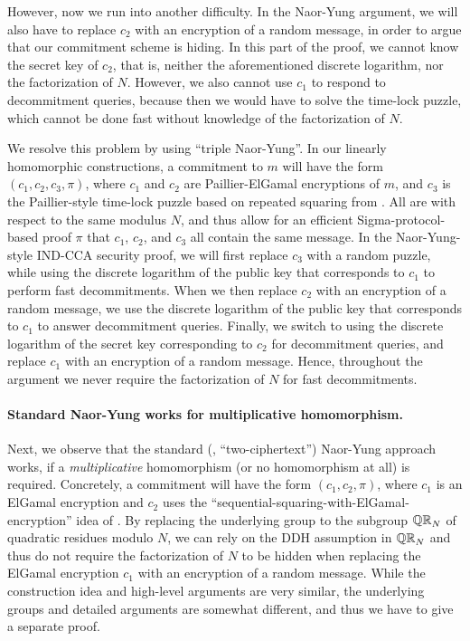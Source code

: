 However, now we run into another difficulty. In the Naor-Yung argument, we will also have to replace $c_2$ with an encryption of a random message, in order to argue that our commitment scheme is hiding. In this part of the proof, we cannot know the secret key of $c_2$, that is, neither the aforementioned discrete logarithm, nor the factorization of $N$. However, we also cannot use $c_1$ to respond to decommitment queries, because then we would have to solve the time-lock puzzle, which cannot be done fast without knowledge of the factorization of $N$.

We resolve this problem by using ``triple Naor-Yung''. In our linearly homomorphic constructions, a commitment to $m$ will have the form $(c_1, c_2, c_3, \pi)$, where $c_1$ and $c_2$ are Paillier-ElGamal encryptions of $m$, and $c_3$ is the Paillier-style time-lock puzzle based on repeated squaring from \cite{C:MalThy19}. All are with respect to the same modulus $N$, and thus allow for an efficient Sigma-protocol-based proof $\pi$ that $c_1$, $c_2$, and $c_3$ all contain the same message. In the Naor-Yung-style IND-CCA security proof, we will first replace $c_3$ with a random puzzle, while using the discrete logarithm of the public key that corresponds to $c_1$ to perform fast decommitments. When we then replace $c_2$ with an encryption of a random message, we use the discrete logarithm of the public key that corresponds to $c_1$ to answer decommitment queries. Finally, we switch to using the discrete logarithm of the secret key corresponding to $c_{2}$ for decommitment queries, and replace $c_{1}$ with an encryption of a random message. Hence, throughout the argument we never require the factorization of $N$ for fast decommitments.


\paragraph{Standard Naor-Yung works for multiplicative homomorphism.}
Next, we observe that the standard (\ie, ``two-ciphertext'') Naor-Yung approach works, if a \emph{multiplicative} homomorphism (or no homomorphism at all) is required. Concretely, a commitment will have the form $(c_1, c_2, \pi)$, where $c_1$ is an ElGamal encryption and $c_2$ uses the ``sequential-squaring-with-ElGamal-encryption'' idea of \cite{C:MalThy19}. By replacing the underlying group to the subgroup $\mathbb{QR}_N$ of quadratic residues modulo $N$, we can rely on the DDH assumption in $\mathbb{QR}_N$ and thus do not require the factorization of $N$ to be hidden when replacing the ElGamal encryption $c_1$ with an encryption of a random message.
While the construction idea and high-level arguments are very similar, the underlying groups and detailed arguments are somewhat different, and thus we have to give a separate proof.




